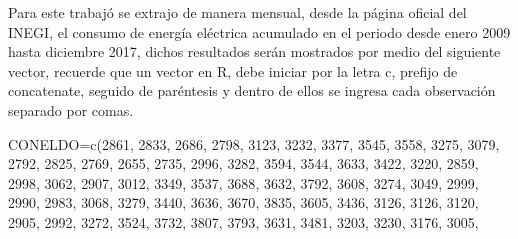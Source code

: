 \documentclass[
  spanish,
]{book}
\newenvironment{Shaded}{\begin{snugshade}}{\end{snugshade}}
\newcommand{\DecValTok}[1]{\textcolor[rgb]{0.00,0.00,0.81}{#1}}
\newcommand{\FunctionTok}[1]{\textcolor[rgb]{0.00,0.00,0.00}{#1}}
\newcommand{\NormalTok}[1]{#1}
\newcommand{\OtherTok}[1]{\textcolor[rgb]{0.56,0.35,0.01}{#1}}
\theoremstyle{remark}
\begin{document}
Para este trabajó se extrajo de manera mensual, desde la página oficial del INEGI, el consumo de energía eléctrica acumulado en el periodo desde enero 2009 hasta diciembre 2017, dichos resultados serán mostrados por medio del siguiente vector, recuerde que un vector en R, debe iniciar por la letra c, prefijo de concatenate, seguido de paréntesis y dentro de ellos se ingresa cada observación separado por comas.

\begin{Shaded}
\begin{Highlighting}[]
\NormalTok{CONELDO}\OtherTok{=}\FunctionTok{c}\NormalTok{(}\DecValTok{2861}\NormalTok{, }\DecValTok{2833}\NormalTok{,   }\DecValTok{2686}\NormalTok{,   }\DecValTok{2798}\NormalTok{,   }\DecValTok{3123}\NormalTok{,   }\DecValTok{3232}\NormalTok{,   }\DecValTok{3377}\NormalTok{,   }\DecValTok{3545}\NormalTok{,   }\DecValTok{3558}\NormalTok{,   }
          \DecValTok{3275}\NormalTok{, }\DecValTok{3079}\NormalTok{,   }\DecValTok{2792}\NormalTok{,   }\DecValTok{2825}\NormalTok{,   }\DecValTok{2769}\NormalTok{,   }\DecValTok{2655}\NormalTok{,   }\DecValTok{2735}\NormalTok{,   }\DecValTok{2996}\NormalTok{,   }\DecValTok{3282}\NormalTok{,}
          \DecValTok{3594}\NormalTok{, }\DecValTok{3544}\NormalTok{,   }\DecValTok{3633}\NormalTok{,   }\DecValTok{3422}\NormalTok{,   }\DecValTok{3220}\NormalTok{,   }\DecValTok{2859}\NormalTok{,   }\DecValTok{2998}\NormalTok{,   }\DecValTok{3062}\NormalTok{,   }\DecValTok{2907}\NormalTok{,}
          \DecValTok{3012}\NormalTok{, }\DecValTok{3349}\NormalTok{,   }\DecValTok{3537}\NormalTok{,   }\DecValTok{3688}\NormalTok{,   }\DecValTok{3632}\NormalTok{,   }\DecValTok{3792}\NormalTok{,   }\DecValTok{3608}\NormalTok{, }\DecValTok{3274}\NormalTok{, }\DecValTok{3049}\NormalTok{,}
          \DecValTok{2999}\NormalTok{, }\DecValTok{2990}\NormalTok{,   }\DecValTok{2983}\NormalTok{,   }\DecValTok{3068}\NormalTok{,   }\DecValTok{3279}\NormalTok{,   }\DecValTok{3440}\NormalTok{,   }\DecValTok{3636}\NormalTok{,   }\DecValTok{3670}\NormalTok{,   }\DecValTok{3835}\NormalTok{,}
          \DecValTok{3605}\NormalTok{, }\DecValTok{3436}\NormalTok{,   }\DecValTok{3126}\NormalTok{,   }\DecValTok{3126}\NormalTok{,   }\DecValTok{3120}\NormalTok{,   }\DecValTok{2905}\NormalTok{,   }\DecValTok{2992}\NormalTok{,   }\DecValTok{3272}\NormalTok{,   }\DecValTok{3524}\NormalTok{,}
          \DecValTok{3732}\NormalTok{, }\DecValTok{3807}\NormalTok{,   }\DecValTok{3793}\NormalTok{,   }\DecValTok{3631}\NormalTok{,   }\DecValTok{3481}\NormalTok{,   }\DecValTok{3203}\NormalTok{,   }\DecValTok{3230}\NormalTok{,   }\DecValTok{3176}\NormalTok{,   }\DecValTok{3005}\NormalTok{,   }

\end{Highlighting}
\end{Shaded}
\end{document}
